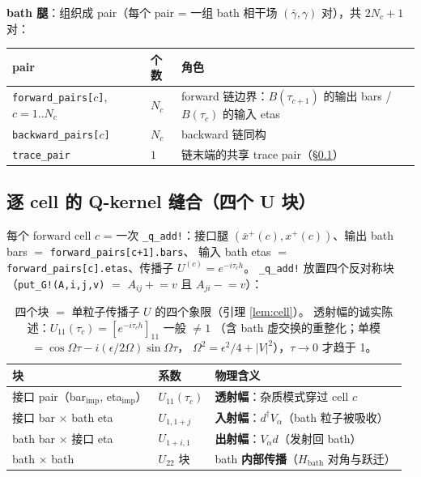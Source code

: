 \documentclass[11pt,a4paper]{ctexart}
\theoremstyle{plain}
\theoremstyle{definition}
\theoremstyle{remark}
\begin{document}
\textbf{bath 腿}：组织成 pair（每个 pair = 一组 bath 相干场
$(\bar\gamma, \gamma)$ 对），共 $2N_c + 1$ 对：

\begin{table}[htbp]
\centering
\begin{tabular}{lll}
\toprule
pair & 个数 & 角色 \\
\midrule
\texttt{forward\_pairs[$c$]}, $c = 1..N_c$ & $N_c$ & forward 链边界：$B(\tau_{c+1})$ 的输出 bars / $B(\tau_c)$ 的输入 etas \\
\texttt{backward\_pairs[$c$]} & $N_c$ & backward 链同构 \\
\texttt{trace\_pair} & $1$ & 链末端的共享 trace pair（\S\ref{sec:qkernel}） \\
\bottomrule
\end{tabular}
\end{table}

\subsection{逐 cell 的 Q-kernel 缝合（四个 U 块）}\label{sec:qkernel}

每个 forward cell $c$ = 一次 \texttt{\_q\_add!}：接口腿
$(\bar x^{+}(c), x^{+}(c))$、输出 bath bars $=$ \texttt{forward\_pairs[c+1].bars}、
输入 bath etas $=$ \texttt{forward\_pairs[c].etas}、传播子 $U^{(c)} = e^{-i\tau_c h}$。
\texttt{\_q\_add!} 放置四个反对称块（\texttt{put\_G!(A,i,j,v)} $=$
$A_{ij} \mathrel{+}= v$ 且 $A_{ji} \mathrel{-}= v$）：

\begin{table}[htbp]
\centering
\begin{tabular}{lll}
\toprule
块 & 系数 & 物理含义 \\
\midrule
接口 pair（bar$_{\mathrm{imp}}$, eta$_{\mathrm{imp}}$） & $U_{11}(\tau_c)$ & \textbf{透射幅}：杂质模式穿过 cell $c$ \\
接口 bar $\times$ bath eta & $U_{1,1+j}$ & \textbf{入射幅}：$d^\dagger V_\alpha$（bath 粒子被吸收） \\
bath bar $\times$ 接口 eta & $U_{1+i,1}$ & \textbf{出射幅}：$V_\alpha d$（发射回 bath） \\
bath $\times$ bath & $U_{22}$ 块 & bath \textbf{内部传播}（$H_{\mathrm{bath}}$ 对角与跃迁） \\
\bottomrule
\end{tabular}
\caption{四个块 $=$ 单粒子传播子 $U$ 的四个象限（引理 \ref{lem:cell}）。
透射幅的诚实陈述：$U_{11}(\tau_c) = [e^{-i\tau_c h}]_{11}$ 一般 $\neq 1$
（含 bath 虚交换的重整化；单模 $= \cos\Omega\tau - i(\epsilon/2\Omega)\sin\Omega\tau$，
$\Omega^2 = \epsilon^2/4 + |V|^2$），$\tau \to 0$ 才趋于 1。}
\end{table}
\end{document}
